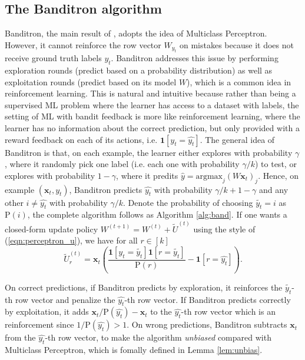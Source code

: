 \documentclass{article}
\begin{document}
\subsection{The Banditron algorithm}
Banditron, the main result of \citet{kakade2008efficient}, adopts the idea of Multiclass Perceptron. However, it cannot reinforce the row vector $W_{y_t}$ on mistakes because it does not receive ground truth labels $y_t$. Banditron addresses this issue by performing exploration rounds (predict based on a probability distribution) as well as exploitation rounds (predict based on its model $W$), which is a common idea in reinforcement learning. This is natural and intuitive because rather than being a supervised ML problem where the learner has access to a dataset with labels, the setting of ML with bandit feedback is more like reinforcement learning, where the learner has no information about the correct prediction, but only provided with a reward feedback on each of its actions, i.e. $\mathbf{1}[y_t=\hat{y_t}]$. The general idea of Banditron is that, on each example, the learner either explores with probability $\gamma$, where it randomly pick one label (i.e. each one with probability $\gamma/k$) to test, or explores with probability $1-\gamma$, where it predits $\hat{y}=\text{argmax}_j(W\mathbf{x}_t)_j$. Hence, on example $(\mathbf{x}_t,y_t)$, Banditron predicts $\hat{y_t}$ with probability $\gamma/k+1-\gamma$ and any other $i\neq\hat{y_t}$ with probability $\gamma/k$. Denote the probability of choosing $\tilde{y_t}=i$ as $\text{P}(i)$, the complete algorithm follows as Algorithm \ref{alg:band}. If one wants a closed-form update policy $W^{(t+1)}=W^{(t)}+\tilde{U}^{(t)}$ using the style of (\ref{eqn:perceptron_u}), we have for all $r\in[k]$ \begin{equation}\label{eqn:banditron_u}
    \tilde{U}^{(t)}_r=\mathbf{x}_t\left(\frac{\mathbf{1}[y_t=\tilde{y_t}]\mathbf{1}[r=\tilde{y_t}]}{\text{P}(r)}-\mathbf{1}[r=\hat{y_t}]\right).
\end{equation}

On correct predictions, if Banditron predicts by exploration, it reinforces the $\tilde{y_t}$-th row vector and penalize the $\hat{y_t}$-th row vector. If Banditron predicts correctly by exploitation, it adds $\mathbf{x}_t/\text{P}(\hat{y_t})-\mathbf{x}_t$ to the $\hat{y_t}$-th row vector which is an reinforcement since $1/\text{P}(\hat{y_t})>1$. On wrong predictions, Banditron subtracts $\mathbf{x}_t$ from the $\hat{y_t}$-th row vector, to make the algorithm \textit{unbiased} compared with Multiclass Perceptron, which is fomally defined in Lemma \ref{lem:unbias}.
\end{document}
